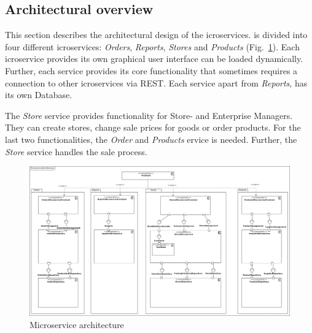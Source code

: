 	\subsection{Architectural overview}	\label{archiOverviewMicro}	
	This section describes the architectural design of the icroservices. 
	\CoCoME is divided into four different icroservices: \textit{Orders}, \textit{Reports}, \textit{Stores} and \textit{Products} (Fig.~\ref{MS_ARch}). 
	Each icroservice provides its own graphical user interface
	 can be loaded dynamically. 
	Further, each service provides its core functionality that sometimes requires a connection to other icroservices via REST. 
	Each service apart from \textit{Reports}, has its own Database.

	The \textit{Store} service provides functionality for Store- and Enterprise Managers. 
	They can create stores, change sale prices for goods or order products. 
	For the last two functionalities, the \textit{Order} and \textit{Products} ervice is needed. 
	Further, the \textit{Store} service handles the sale process. 
	


	
	
	\begin{figure}
	   	\includegraphics[width=\textwidth]{img/MicroserviceArchitecture.jpg}
	   	\caption{Microservice architecture}
	   	\label{MS_ARch}
	\end{figure}
